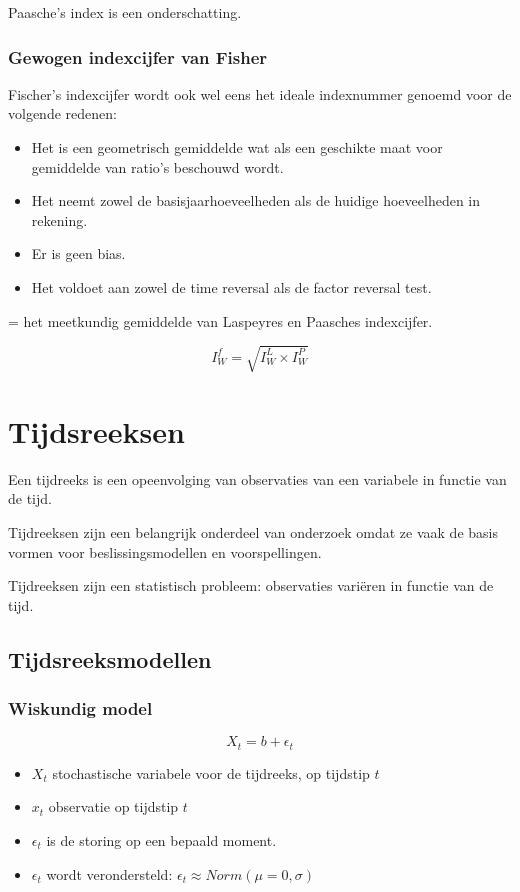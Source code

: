 \documentclass[a4paper,12pt]{article}
\begin{document}
Paasche's index is een onderschatting.

\subsubsection{Gewogen indexcijfer van Fisher}
Fischer’s indexcijfer wordt ook wel eens het ideale indexnummer genoemd voor de volgende redenen:
\begin{itemize}
\item Het is een geometrisch gemiddelde wat als een geschikte maat voor gemiddelde van ratio’s beschouwd wordt.
\item Het neemt zowel de basisjaarhoeveelheden als de huidige hoeveelheden in rekening.
\item Er is geen bias.
\item Het voldoet aan zowel de time reversal als de factor reversal test.
\end{itemize}

= het meetkundig gemiddelde van Laspeyres en Paasches indexcijfer.

\begin{equation}
I^f_W = \sqrt{I^L_W \times I^P_W}
\end{equation}

\section{Tijdsreeksen}
Een tijdreeks is een opeenvolging van observaties van een variabele in functie van de tijd.

Tijdreeksen zijn een belangrijk onderdeel van onderzoek omdat ze vaak de basis vormen voor beslissingsmodellen en voorspellingen.

Tijdreeksen zijn een statistisch probleem: observaties variëren in functie van de tijd.
\subsection{Tijdsreeksmodellen}
\subsubsection{Wiskundig model}
\begin{equation}
X_t = b + \epsilon_t
\label{eq:eenvoudigModelTijdsreeks}
\end{equation}
\begin{itemize}
\item $X_t$ stochastische variabele voor de tijdreeks, op tijdstip $t$
\item $x_t$ observatie op tijdstip $t$
\item $\epsilon_t$ is de storing op een bepaald moment.
\item $\epsilon_t$ wordt verondersteld: $\epsilon_t \approx Norm(\mu=0,\sigma)$
\end{itemize}
\end{document}
